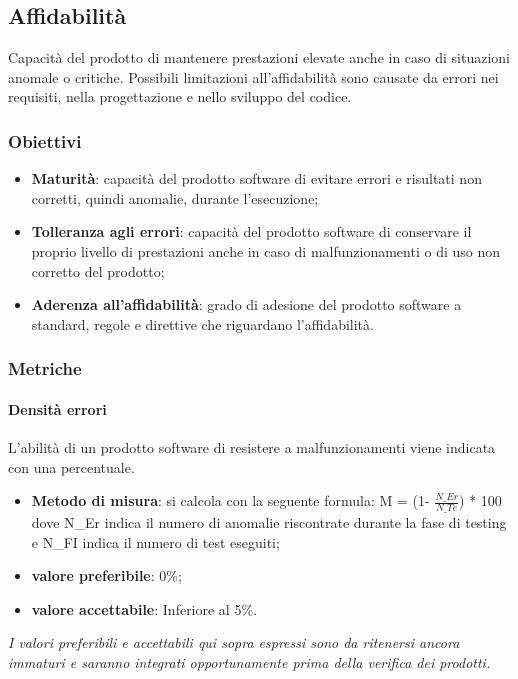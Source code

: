 \subsection{Affidabilità}
Capacità del prodotto di mantenere prestazioni elevate anche in caso di situazioni anomale o critiche.
Possibili limitazioni all’affidabilità sono causate da errori nei requisiti, nella progettazione e nello sviluppo del codice.

\subsubsection{Obiettivi}
\begin{itemize}
\item \textbf{Maturità}: capacità del prodotto software di evitare errori e risultati non corretti, quindi anomalie, durante l’esecuzione;
\item \textbf{Tolleranza agli errori}: capacità del prodotto software di conservare il proprio livello di prestazioni anche in caso di malfunzionamenti o di uso non corretto del prodotto;
\item \textbf{Aderenza all'affidabilità}: grado di adesione del prodotto software a standard, regole e direttive che riguardano l'affidabilità.
\end{itemize}

\subsubsection{Metriche}

\paragraph{Densità errori}
L'abilità di un prodotto software di resistere a malfunzionamenti viene indicata con una percentuale.
\begin{itemize}
\item \textbf{Metodo di misura}: si calcola con la seguente formula:
M = (1- $\frac{N\_Er}{N\_Te}$) * 100
dove N\_Er indica il numero di anomalie riscontrate durante la fase di testing e N\_FI indica il numero di test eseguiti;
\item \textbf{valore preferibile}: 0\%;
\item \textbf{valore accettabile}: Inferiore al 5\%.
\end{itemize}
\textit{I valori preferibili e accettabili qui sopra espressi sono da ritenersi ancora immaturi e saranno integrati opportunamente prima della verifica dei prodotti.}

